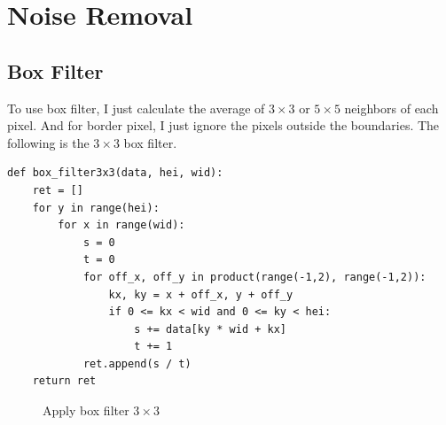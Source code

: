 \documentclass[14pt,a4paper]{extarticle}
\begin{document}
\section{Noise Removal}

\subsection{Box Filter}

To use box filter, I just calculate the average of $3 \times 3$ or $5 \times 5$ neighbors of each pixel. And for border pixel, I just ignore the pixels outside the boundaries. The following is the $3 \times 3$ box filter.
\begin{lstlisting}
def box_filter3x3(data, hei, wid):
	ret = []
	for y in range(hei):
		for x in range(wid):
			s = 0
			t = 0
			for off_x, off_y in product(range(-1,2), range(-1,2)):
				kx, ky = x + off_x, y + off_y
				if 0 <= kx < wid and 0 <= ky < hei:
					s += data[ky * wid + kx]
					t += 1
			ret.append(s / t)
	return ret
\end{lstlisting}

\begin{figure}[H]
\centering
	\hfill
\caption{Apply box filter $3 \times 3$}
\end{figure}
\end{document}
